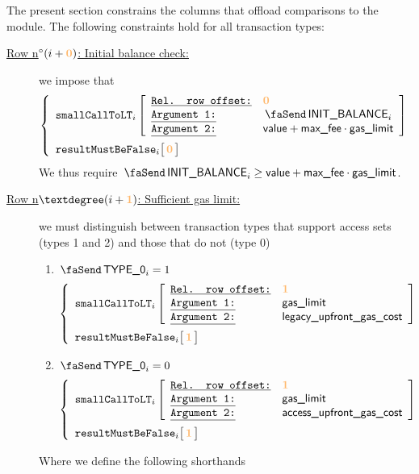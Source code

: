 \begin{center}
\end{center}
The present section constrains the columns that offload comparisons to the \wcpMod{} module.
The following constraints hold for all transaction types: 
\begin{description}
	\item[\underline{\underline{Row n$^\circ(i + \balanceRowOffset)$: Initial balance check:}}]
		we impose that
		\[
			\left\{\begin{array}{l}
				\smallCallToLt
				{i}{\balanceRowOffset}
				{\txInitialBalance_{i}}
				{\locValue + \locMaxFee \cdot \locGasLimit}
				\vspace{2mm}
				\\
				\resultMustBeFalse
				{i}{\balanceRowOffset}
				\\
			\end{array}\right.
		\]
		\saNote{} We thus require $\txInitialBalance_{i} \geq \locValue + \locMaxFee \cdot \locGasLimit$.
	\item[\underline{\underline{Row n$°(i + \gasLimitRowOffset)$: Sufficient gas limit:}}]
		we must distinguish between transaction types that support access sets (types 1 and 2) and those that do not (type 0)
		\begin{enumerate}
			\item \If $\txIsLegacy_{i} = 1$ \Then
				\[
					\left\{\begin{array}{l}
						\smallCallToLt
						{i}{\gasLimitRowOffset}
						{\locGasLimit}
						{\locLegacyUpfrontGasCost}
						\vspace{2mm}
						\\
						\resultMustBeFalse
						{i}{\gasLimitRowOffset}
						\\
					\end{array}\right.
				\]
			\item \If $\txIsLegacy_{i} = 0$ \Then
				\[
					\left\{\begin{array}{l}
						\smallCallToLt
						{i}{\gasLimitRowOffset}
						{\locGasLimit}
						{\locAccessUpfrontGasCost}
						\vspace{2mm}
						\\
						\resultMustBeFalse
						{i}{\gasLimitRowOffset}
						\\
					\end{array}\right.
				\]
		\end{enumerate}
		Where we define the following shorthands

\end{description}

